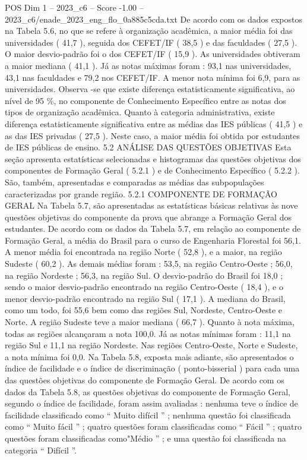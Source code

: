 \begin{textsample}{POS Dim 1 – 2023\_c6 – Score -1.00 – 2023\_c6/enade\_2023\_eng\_flo\_0a885c5cda.txt}
De acordo com os dados expostos na Tabela 5.6, no que se refere à organização acadêmica, a maior média foi das universidades ( 41,7 ), seguida dos CEFET/IF ( 38,5 ) e das faculdades ( 27,5 ).
O maior desvio-padrão foi o dos CEFET/IF ( 15,9 ).
As universidades obtiveram a maior mediana ( 41,1 ).
Já as notas máximas foram : 93,1 nas universidades, 43,1 nas faculdades e 79,2 nos CEFET/IF.
A menor nota mínima foi 6,9, para as universidades.
Observa -se que existe diferença estatisticamente significativa, ao nível de 95 \%, no componente de Conhecimento Específico entre as notas dos tipos de organização acadêmica.
Quanto à categoria administrativa, existe diferença estatisticamente significativa entre as médias das IES públicas ( 41,5 ) e as das IES privadas ( 27,5 ).
Neste caso, a maior média foi obtida por estudantes de IES públicas de ensino. 5.2 ANÁLISE DAS QUESTÕES OBJETIVAS Esta seção apresenta estatísticas selecionadas e histogramas das questões objetivas dos componentes de Formação Geral ( 5.2.1 ) e de Conhecimento Específico ( 5.2.2 ).
São, também, apresentadas e comparadas as médias das subpopulações caracterizadas por grande região. 5.2.1 COMPONENTE DE FORMAÇÃO GERAL Na Tabela 5.7, são apresentadas as estatísticas básicas relativas às nove questões objetivas do componente da prova que abrange a Formação Geral dos estudantes.
De acordo com os dados da Tabela 5.7, em relação ao componente de Formação Geral, a média do Brasil para o curso de Engenharia Florestal foi 56,1.
A menor média foi encontrada na região Norte ( 52,8 ), e a maior, na região Sudeste ( 60,2 ).
As demais médias foram : 53,5, na região Centro-Oeste ; 56,0, na região Nordeste ; 56,3, na região Sul.
O desvio-padrão do Brasil foi 18,0 ; sendo o maior desvio-padrão encontrado na região Centro-Oeste ( 18,4 ), e o menor desvio-padrão encontrado na região Sul ( 17,1 ).
A mediana do Brasil, como um todo, foi 55,6 bem como das regiões Sul, Nordeste, Centro-Oeste e Norte.
A região Sudeste teve a maior mediana ( 66,7 ).
Quanto à nota máxima, todas as regiões alcançaram a nota 100,0.
Já as notas mínimas foram : 11,1 na região Sul e 11,1 na região Nordeste.
Nas regiões Centro-Oeste, Norte e Sudeste, a nota mínima foi 0,0.
Na Tabela 5.8, exposta mais adiante, são apresentados o índice de facilidade e o índice de discriminação ( ponto-bisserial ) para cada uma das questões objetivas do componente de Formação Geral.
De acordo com os dados da Tabela 5.8, as questões objetivas do componente de Formação Geral, segundo o índice de facilidade, foram assim avaliadas : nenhuma teve o índice de facilidade classificado como “ Muito difícil ” ; nenhuma questão foi classificada como “ Muito fácil ” ; quatro questões foram classificadas como “ Fácil ” ; quatro questões foram classificadas como"Médio ” ; e uma questão foi classificada na categoria “ Difícil ”.

\end{textsample}
